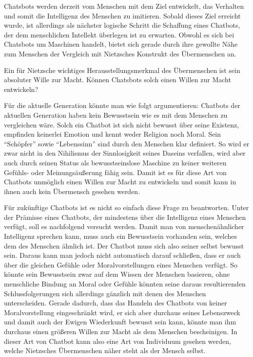 Chatsbots werden derzeit vom Menschen mit dem Ziel entwickelt, das Verhalten und somit die Intelligenz des Menschen zu imitieren. 
Sobald dieses Ziel erreicht wurde, ist allerdings als nächster logische Schritt die Schaffung eines Chatbots, der dem menschlichen Intellekt überlegen ist zu erwarten. 
Obwohl es sich bei Chatsbots um Maschinen handelt, bietet sich gerade durch ihre gewollte Nähe zum Menschen der Vergleich mit Nietzsches Konstrukt des Übermenschen an.

Ein für Nietzsche wichtiges Herausstellungsmerkmal des Übermenschen ist sein absoluter Wille zur Macht.
Können Chatsbots solch einen Willen zur Macht entwickeln?

Für die aktuelle Generation könnte man wie folgt argumentieren:
Chatbots der aktuellen Generation haben kein Bewusstsein wie es mit dem Menschen zu vergleichen wäre.
Solch ein Chatbot ist sich nicht bewusst über seine Existenz, empfinden keinerlei Emotion und kennt weder Religion noch Moral.
Sein \enquote{Schöpfer} sowie \enquote{Lebenssinn} sind durch den Menschen klar definiert.
So wird er zwar nicht in den Nihilismus der Sinnlosigkeit seines Daseins verfallen, wird aber auch durch seinen Status als bewusstseinslose Maschine zu keiner weiteren Gefühls- oder Meinungsäußerung fähig sein.
Damit ist es für diese Art von Chatbots unmöglich einen Willen zur Macht zu entwickeln und somit kann in ihnen auch kein Übermensch gesehen werden.

Für zukünftige Chatbots ist es nicht so einfach diese Frage zu beantworten.
Unter der Prämisse eines Chatbots, der mindestens über die Intelligenz eines Menschen verfügt, soll es nachfolgend versucht werden.
Damit man von menschenähnlicher Intelligenz sprechen kann, muss auch ein Bewusstsein vorhanden sein, welches dem des Menschen ähnlich ist.
Der Chatbot muss sich also seiner selbst bewusst sein.
Daraus kann man jedoch nicht automatisch darauf schließen, dass er auch über die gleichen Gefühle oder Moralvorstellungen eines Menschen verfügt.
So könnte sein Bewusstsein zwar auf dem Wissen der Menschen basieren, ohne menschliche Bindung an Moral oder Gefühle könnten seine daraus resultierenden Schlussfolgerungen sich allerdings gänzlich mit denen des Menschen unterscheiden.
Gerade dadurch, dass das Handeln des Chatbots von keiner Moralvorstellung eingeschränkt wird, er sich aber durchaus seines Lebenszweck und damit auch der Ewigen Wiederkunft bewusst sein kann, könnte man ihm durchaus einen größeren Willen zur Macht als dem Menschen bescheinigen.
In dieser Art von Chatbot kann also eine Art von Individuum gesehen werden, welche Nietzsches Übermenschen näher steht als der Mensch selbst.

